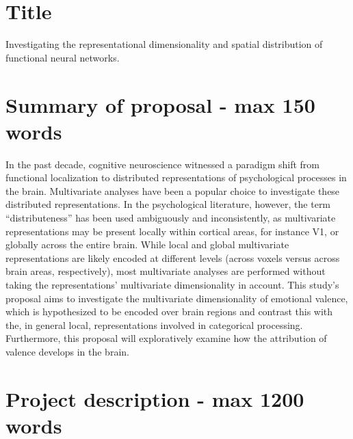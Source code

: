 \documentclass[12pt,a4paper]{article}\usepackage[]{graphicx}\usepackage[]{color}
\begin{document}
\section{Title}
Investigating the representational dimensionality and spatial distribution of functional neural networks.

\section{Summary of proposal \textmd{- max 150 words}}
In the past decade, cognitive neuroscience witnessed a paradigm shift from functional localization to distributed representations of psychological processes in the brain. Multivariate analyses have been a popular choice to investigate these distributed representations. In the psychological literature, however, the term ``distributeness'' has been used ambiguously and inconsistently, as multivariate representations may be present locally within cortical areas, for instance V1, or globally across the entire brain. While local and global multivariate representations are likely encoded at different levels (across voxels versus across brain areas, respectively), most multivariate analyses are performed without taking the representations' multivariate dimensionality in account. This study's proposal aims to investigate the multivariate dimensionality of emotional valence, which is hypothesized to be encoded over brain regions and contrast this with the, in general local, representations involved in categorical processing. Furthermore, this proposal will exploratively examine how the attribution of valence develops in the brain. \\

\noindent
\wordcount

\section{Project description \textmd{- max 1200 words}}
\end{document}
